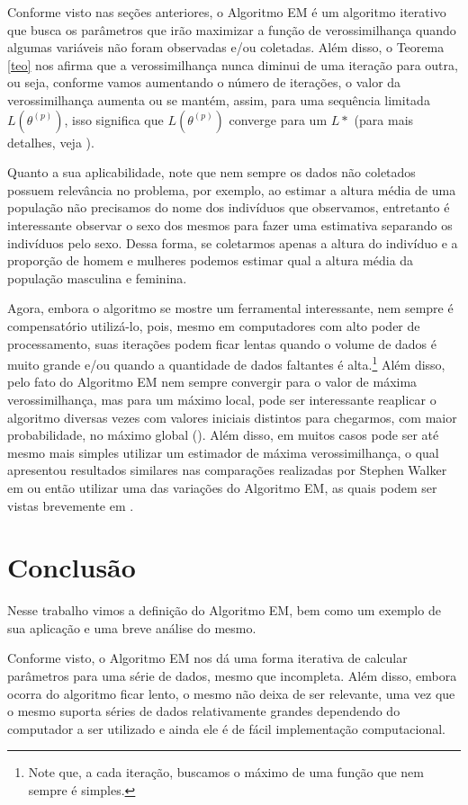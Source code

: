\documentclass{article}
\begin{document}
Conforme visto nas seções anteriores, o Algoritmo EM é um algoritmo iterativo que busca os parâmetros que irão maximizar a função de verossimilhança quando algumas variáveis não foram observadas e/ou coletadas. Além disso, o Teorema \ref{teo} nos afirma que a verossimilhança nunca diminui de uma iteração para outra, ou seja, conforme vamos aumentando o número de iterações, o valor da verossimilhança aumenta ou se mantém, assim, para uma sequência limitada $L(\theta^{(p)})$, isso significa que $L(\theta^{(p)})$ converge para um $L*$ (para mais detalhes, veja \cite{wu1983}).

Quanto a sua aplicabilidade, note que nem sempre os dados não coletados possuem relevância no problema, por exemplo, ao estimar a altura média de uma população não precisamos do nome dos indivíduos que observamos, entretanto é interessante observar o sexo dos mesmos para fazer uma estimativa separando os indivíduos pelo sexo. Dessa forma, se coletarmos apenas a altura do indivíduo e a proporção de homem e mulheres podemos estimar qual a altura média da população masculina e feminina.

Agora, embora o algoritmo se mostre um ferramental interessante, nem sempre é compensatório utilizá-lo, pois, mesmo em computadores com alto poder de processamento, suas iterações podem ficar lentas quando o volume de dados é muito grande e/ou quando a quantidade de dados faltantes é alta.\footnote{Note que, a cada iteração, buscamos o máximo de uma função que nem sempre é simples.} Além disso, pelo fato do Algoritmo EM nem sempre convergir para o valor de máxima verossimilhança, mas para um máximo local, pode ser interessante reaplicar o algoritmo diversas vezes com valores iniciais distintos para chegarmos, com maior probabilidade, no máximo global (\cite{statisticshowto}). Além disso, em muitos casos pode ser até mesmo mais simples utilizar um estimador de máxima verossimilhança, o qual apresentou resultados similares nas comparações realizadas por Stephen Walker em \cite{10.2307/2533054} ou então utilizar uma das variações do Algoritmo EM, as quais podem ser vistas brevemente em \cite{roche2011em}.

\section*{Conclusão}

Nesse trabalho vimos a definição do Algoritmo EM, bem como um exemplo de sua aplicação e uma breve análise do mesmo.

Conforme visto, o Algoritmo EM nos dá uma forma iterativa de calcular parâmetros para uma série de dados, mesmo que incompleta. Além disso, embora ocorra do algoritmo ficar lento, o mesmo não deixa de ser relevante, uma vez que o mesmo suporta séries de dados relativamente grandes dependendo do computador a ser utilizado e ainda ele é de fácil implementação computacional.

\printbibliography
\end{document}
